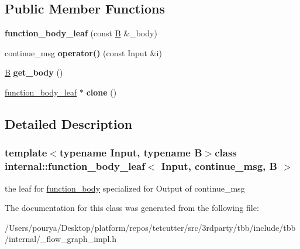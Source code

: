 \subsection*{Public Member Functions}
\begin{DoxyCompactItemize}
\item 
\hypertarget{classinternal_1_1function__body__leaf_3_01Input_00_01continue__msg_00_01B_01_4_ad24d79482e2d8e1727676300551956d0}{}{\bfseries function\+\_\+body\+\_\+leaf} (const \hyperlink{classB}{B} \&\+\_\+body)\label{classinternal_1_1function__body__leaf_3_01Input_00_01continue__msg_00_01B_01_4_ad24d79482e2d8e1727676300551956d0}

\item 
\hypertarget{classinternal_1_1function__body__leaf_3_01Input_00_01continue__msg_00_01B_01_4_a16f23bdd7f14c51e9a19a8f48148e33c}{}continue\+\_\+msg {\bfseries operator()} (const Input \&i)\label{classinternal_1_1function__body__leaf_3_01Input_00_01continue__msg_00_01B_01_4_a16f23bdd7f14c51e9a19a8f48148e33c}

\item 
\hypertarget{classinternal_1_1function__body__leaf_3_01Input_00_01continue__msg_00_01B_01_4_ac45a239f77000becda80169a829f803c}{}\hyperlink{classB}{B} {\bfseries get\+\_\+body} ()\label{classinternal_1_1function__body__leaf_3_01Input_00_01continue__msg_00_01B_01_4_ac45a239f77000becda80169a829f803c}

\item 
\hypertarget{classinternal_1_1function__body__leaf_3_01Input_00_01continue__msg_00_01B_01_4_a42460c83f2860d94929e58881ce08ad3}{}\hyperlink{classinternal_1_1function__body__leaf}{function\+\_\+body\+\_\+leaf} $\ast$ {\bfseries clone} ()\label{classinternal_1_1function__body__leaf_3_01Input_00_01continue__msg_00_01B_01_4_a42460c83f2860d94929e58881ce08ad3}

\end{DoxyCompactItemize}


\subsection{Detailed Description}
\subsubsection*{template$<$typename Input, typename B$>$class internal\+::function\+\_\+body\+\_\+leaf$<$ Input, continue\+\_\+msg, B $>$}

the leaf for \hyperlink{classinternal_1_1function__body}{function\+\_\+body} specialized for Output of continue\+\_\+msg 

The documentation for this class was generated from the following file\+:\begin{DoxyCompactItemize}
\item 
/\+Users/pourya/\+Desktop/platform/repos/tetcutter/src/3rdparty/tbb/include/tbb/internal/\+\_\+flow\+\_\+graph\+\_\+impl.\+h\end{DoxyCompactItemize}

